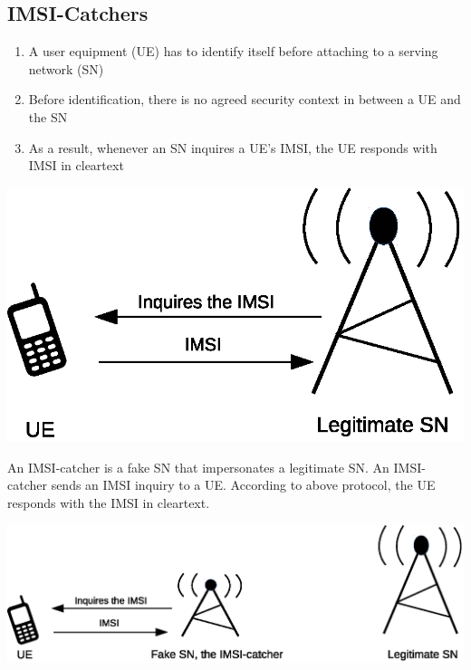 \documentclass[portrait,a0]{a0poster}
\begin{document}
\begin{multicols}{2} %


\section{IMSI-Catchers}
\begin{enumerate}
\item A user equipment (UE) has to identify itself before attaching to a serving network (SN)
\item Before identification, there is no agreed security context in between a UE and the SN
\item As a result, whenever an SN inquires a UE's IMSI, the UE responds with IMSI in cleartext
\end{enumerate}

\begin{center}
\begin{minipage}[t]{0.9\linewidth} %
\vspace{.25cm} %
\includegraphics[width=.8\linewidth]{IMSI-catcher.eps}
\hspace{0pt}
\vspace{.25cm} %
\end{minipage} 
\end{center}

\noindent
An IMSI-catcher is a fake SN that impersonates a legitimate SN. An IMSI-catcher sends an IMSI inquiry to a UE. According to above protocol, the UE responds with the IMSI in cleartext.

\begin{center}
\begin{minipage}[t]{0.9\linewidth} %
\vspace{.25cm} %
\includegraphics[width=1\linewidth]{IMSI-catcher1.eps}
\hspace{0pt}
\vspace{.25cm} %
\end{minipage} 
\end{center}



\end{multicols}
\end{document}
